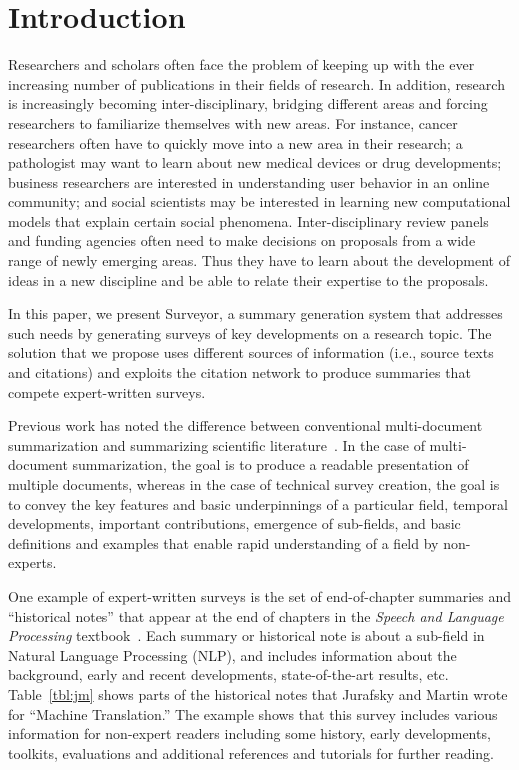 \section{Introduction}
\label{sec:intro}

Researchers and scholars often face the problem of keeping up with the
ever increasing number of publications in their fields of research.
In addition, research is increasingly becoming inter-disciplinary,
bridging different areas and forcing researchers to 
familiarize themselves with new areas.  For instance, cancer
researchers often have to quickly move into a new area in their
research;
a pathologist may want to learn about new medical devices
or drug developments; 
business researchers are interested in
understanding user behavior in an online community; 
and social scientists may be interested in learning new computational models
that explain certain social phenomena.
Inter-disciplinary review
panels and funding agencies often need to make decisions on proposals
from a wide range of newly emerging areas. Thus they have to learn
about the development of ideas in a new discipline and be able to
relate their expertise to the proposals.

In this paper, we present Surveyor, a summary generation system that
addresses such needs by generating surveys of key developments on a
research topic.  The solution that we propose uses different sources
of information (i.e., source texts and citations) and exploits the
citation network to produce summaries that compete expert-written
surveys.

Previous work has noted the difference between conventional
multi-document summarization and summarizing scientific
literature~\cite{mohammad-EtAl:2009:NAACLHLT09}.  In the case of
multi-document summarization, the goal is to produce a readable
presentation of multiple documents, whereas in the case of technical
survey creation, the goal is to convey the key features and basic
underpinnings of a particular field, temporal developments, important
contributions, emergence of sub-fields, and basic definitions and
examples that enable rapid understanding of a field by non-experts.

One example of expert-written surveys is the set of
end-of-chapter summaries and ``historical notes'' that appear at the
end of chapters in the \emph{Speech and Language Processing}
textbook~\cite{JurafskyM08}. Each summary or historical note is about
a sub-field in Natural Language Processing (NLP), and includes
information about the background,  early and recent developments,
state-of-the-art results, etc. Table~\ref{tbl:jm} shows parts
of the historical notes that Jurafsky and Martin wrote for ``Machine
Translation.'' The example shows that this survey includes various
information for non-expert readers including some history, early
developments, toolkits, evaluations and additional references and
tutorials for further reading. 

